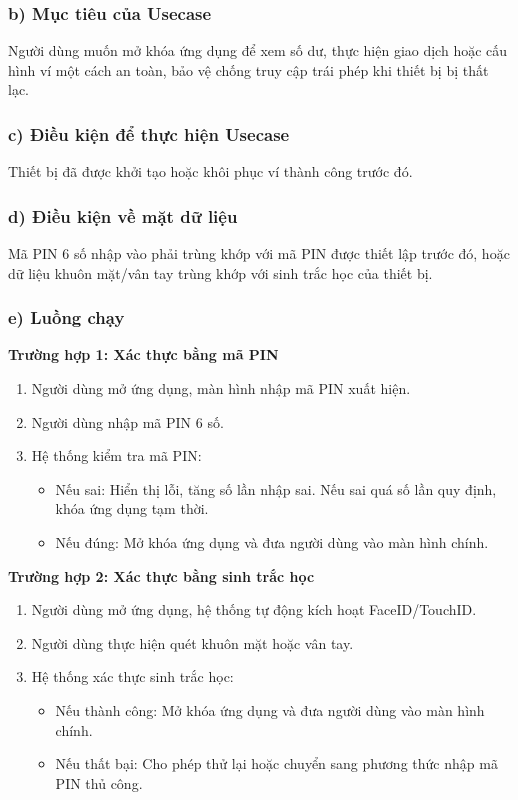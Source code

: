 \documentclass[a4paper]{report}
\begin{document}
\subsubsection{b) Mục tiêu của Usecase}
Người dùng muốn mở khóa ứng dụng để xem số dư, thực hiện giao dịch hoặc cấu hình ví một cách an toàn, bảo vệ chống truy cập trái phép khi thiết bị bị thất lạc.

\subsubsection{c) Điều kiện để thực hiện Usecase}
Thiết bị đã được khởi tạo hoặc khôi phục ví thành công trước đó.

\subsubsection{d) Điều kiện về mặt dữ liệu}
Mã PIN 6 số nhập vào phải trùng khớp với mã PIN được thiết lập trước đó, hoặc dữ liệu khuôn mặt/vân tay trùng khớp với sinh trắc học của thiết bị.

\subsubsection{e) Luồng chạy}
\textbf{Trường hợp 1: Xác thực bằng mã PIN}
\begin{enumerate}
    \item Người dùng mở ứng dụng, màn hình nhập mã PIN xuất hiện.
    \item Người dùng nhập mã PIN 6 số.
    \item Hệ thống kiểm tra mã PIN:
    \begin{itemize}
        \item Nếu sai: Hiển thị lỗi, tăng số lần nhập sai. Nếu sai quá số lần quy định, khóa ứng dụng tạm thời.
        \item Nếu đúng: Mở khóa ứng dụng và đưa người dùng vào màn hình chính.
    \end{itemize}
\end{enumerate}

\textbf{Trường hợp 2: Xác thực bằng sinh trắc học}
\begin{enumerate}
    \item Người dùng mở ứng dụng, hệ thống tự động kích hoạt FaceID/TouchID.
    \item Người dùng thực hiện quét khuôn mặt hoặc vân tay.
    \item Hệ thống xác thực sinh trắc học:
    \begin{itemize}
        \item Nếu thành công: Mở khóa ứng dụng và đưa người dùng vào màn hình chính.
        \item Nếu thất bại: Cho phép thử lại hoặc chuyển sang phương thức nhập mã PIN thủ công.
    \end{itemize}
\end{enumerate}
\end{document}
